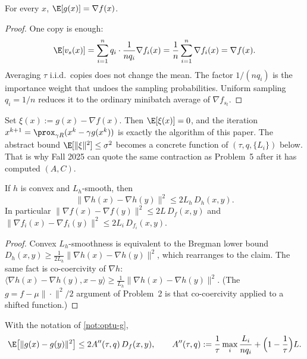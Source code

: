 \begin{proposition}[Unbiasedness]
\label{prop:optu-unbiased}
For every $x$, $\E[g(x)]=\nabla f(x)$.
\end{proposition}

\begin{proof}
One copy is enough:
\[
\E[v_s(x)]
=
\sum_{i=1}^n q_i\cdot\frac1{n q_i}\nabla f_i(x)
=
\frac1n\sum_{i=1}^n\nabla f_i(x)
=
\nabla f(x).
\]
Averaging $\tau$ i.i.d.\ copies does not change the mean. The factor $1/(n q_i)$ is the importance weight that undoes the sampling probabilities. Uniform sampling $q_i=1/n$ reduces it to the ordinary minibatch average of $\nabla f_{s_t}$.
\end{proof}

\begin{remark}
\label{rem:optu-xi-is-g}
Set $\xi(x):=g(x)-\nabla f(x)$. Then $\E[\xi(x)]=0$, and the iteration $x^{k+1}=\prox_{\gamma R}(x^k-\gamma g(x^k))$ is exactly the algorithm of this paper. The abstract bound $\E[\|\xi\|^2]\le\sigma^2$ becomes a concrete function of $(\tau,q,\{L_i\})$ below. That is why Fall 2025 can quote the same contraction as Problem~5 after it has computed $(A,C)$.
\end{remark}

\begin{proposition}
\label{prop:optu-bregman}
If $h$ is convex and $L_h$-smooth, then
\[
\|\nabla h(x)-\nabla h(y)\|^2
\le
2 L_h\, D_h(x,y).
\]
In particular $\|\nabla f(x)-\nabla f(y)\|^2\le 2L\, D_f(x,y)$ and $\|\nabla f_i(x)-\nabla f_i(y)\|^2\le 2 L_i\, D_{f_i}(x,y)$.
\end{proposition}

\begin{proof}
Convex $L_h$-smoothness is equivalent to the Bregman lower bound $D_h(x,y)\ge\frac1{2L_h}\|\nabla h(x)-\nabla h(y)\|^2$, which rearranges to the claim. The same fact is co-coercivity of $\nabla h$: $\langle\nabla h(x)-\nabla h(y),x-y\rangle\ge\frac1{L_h}\|\nabla h(x)-\nabla h(y)\|^2$. (The $g=f-\mu\|\cdot\|^2/2$ argument of Problem~2 is that co-coercivity applied to a shifted function.)
\end{proof}

\begin{proposition}
\label{prop:optu-es}
With the notation of \cref{not:optu-g},
\[
\E\bigl[\|g(x)-g(y)\|^2\bigr]
\le
2 A''(\tau,q)\, D_f(x,y),
\qquad
A''(\tau,q)
:=
\frac1\tau\max_i\frac{L_i}{n q_i}
+
\Bigl(1-\frac1\tau\Bigr)L.
\]
\end{proposition}

